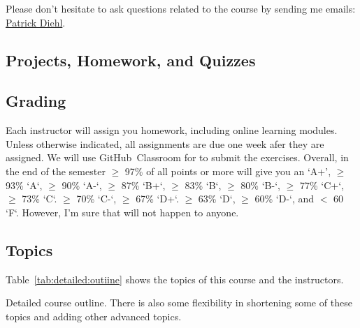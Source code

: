 \documentclass[11pt,letterpaper]{article}
\begin{document}
Please don’t hesitate to ask questions related to the course by sending me emails: \href{mailto:patrickdiehl@lsu.edu}{Patrick Diehl}. 

\subsection*{Projects, Homework, and Quizzes}

\subsection*{Grading}
Each instructor will assign you homework, including online learning modules. Unless otherwise indicated, all assignments are due one week afer they are assigned. We will use GitHub\textsuperscript{\textregistered}~Classroom for to submit the exercises.  Overall, in the end of the semester $\geq$ 97\% of all points or more will give you an ‘A+’,  $\geq$ 93\% `A`,  $\geq$ 90\% `A-`,  $\geq$  87\% `B+`,  $\geq$  83\% `B`,  $\geq$  80\% `B-`,  $\geq$ 77\% `C+`,  $\geq$ 73\% `C`.  $\geq$  70\% `C-`,  $\geq$  67\% `D+`.  $\geq$  63\% `D`,  $\geq$  60\% `D-`, and $<$ 60 `F`. However, I’m sure that will not happen to anyone.


\subsection*{Topics}
Table~\ref{tab:detailed:outiine} shows the topics of this course and the instructors.

\begin{table}[tbp]
\caption{Detailed course outline. There  is  also some flexibility in shortening some of these topics and adding other advanced topics.}
\label{tab:detailed:outiine}
\end{table}
\end{document}
